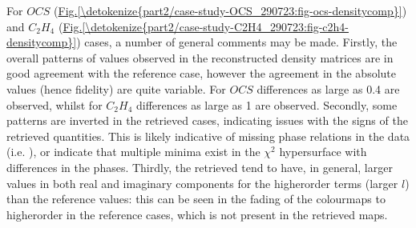 \documentclass[letterpaper,table,10pt,english]{jupyterBook}
\begin{document}
\sphinxAtStartPar
For \(OCS\) (\hyperref[\detokenize{part2/case-study-OCS_290723:fig-ocs-densitycomp}]{Fig.\@ \ref{\detokenize{part2/case-study-OCS_290723:fig-ocs-densitycomp}}}) and \(C_2H_4\) (\hyperref[\detokenize{part2/case-study-C2H4_290723:fig-c2h4-densitycomp}]{Fig.\@ \ref{\detokenize{part2/case-study-C2H4_290723:fig-c2h4-densitycomp}}}) cases, a number of general comments may be made. Firstly, the overall patterns of values observed in the reconstructed density matrices are in good agreement with the reference case, however the agreement in the absolute values (hence fidelity) are quite variable. For \(OCS\) differences as large as 0.4 are observed, whilst for \(C_2H_4\) differences as large as 1 are observed. Secondly, some patterns are inverted in the retrieved cases, indicating issues with the signs of the retrieved quantities. This is likely indicative of missing phase relations in the data (i.e. {\hyperref[\detokenize{backmatter/glossary:term-channel-functions}]{}}), or indicate that multiple minima exist in the \(\chi^2\) hypersurface with differences in the phases. Thirdly, the retrieved {\hyperref[\detokenize{backmatter/glossary:term-radial-matrix-elements}]{}} tend to have, in general, larger values in both real and imaginary components for the higher\sphinxhyphen{}order terms (larger \(l\)) than the reference values: this can be seen in the fading of the colourmaps to higher\sphinxhyphen{}order in the reference cases, which is not present in the retrieved maps.
\end{document}
